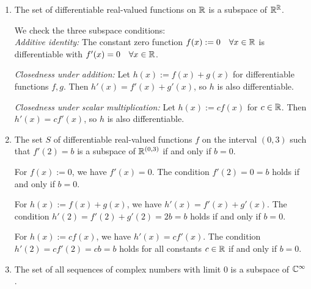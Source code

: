 \begin{xrcs}
\begin{enumerate}
{      \begin{xsol}
        The zero function $f(x) = 0$ is continuous. The sum of two continuous functions is continuous, and any scalar multiple of a continuous function is continuous. Thus, it is a subspace.
      \end{xsol}
    }

    \item{
      The set of differentiable real-valued functions on $\mathbb{R}$ is a subspace of $\mathbb{R}^{\mathbb{R}}$.

      \begin{xsol}
        We check the three subspace conditions: \\
        \emph{Additive identity:} The constant zero function $f(x) := 0 \quad \forall x \in \mathbb{R}$ is differentiable with $f'(x) = 0 \quad \forall x \in \mathbb{R}$.

        \emph{Closedness under addition:} Let $h(x) := f(x) + g(x)$ for differentiable functions $f, g$. Then $h'(x) = f'(x) + g'(x)$, so $h$ is also differentiable.

        \emph{Closedness under scalar multiplication:} Let $h(x) := c f(x)$ for $c \in \mathbb{R}$. Then $h'(x) = c f'(x)$, so $h$ is also differentiable.
      \end{xsol}
    }

    \item{
      The set $S$ of differentiable real-valued functions $f$ on the interval $(0,3)$ such that $f'(2) = b$ is a subspace of $\mathbb{R}^{(0,3)}$ if and only if $b=0$.

      \begin{xsol}
        For $f(x) := 0$, we have $f'(x) = 0$. The condition $f'(2) = 0 = b$ holds if and only if $b=0$.

        For $h(x) := f(x) + g(x)$, we have $h'(x) = f'(x) + g'(x)$. The condition $h'(2) = f'(2) + g'(2) = 2b = b$ holds if and only if $b=0$.

        For $h(x) := cf(x)$, we have $h'(x) = cf'(x)$. The condition $h'(2) = cf'(2) = cb = b$ holds for all constants $c \in \mathbb{R}$ if and only if $b=0$.
      \end{xsol}
    }
    \item{
      The set of all sequences of complex numbers with limit $0$ is a subspace of $\mathbb{C}^\infty$.
    }
  \end{enumerate}
\end{xrcs}

